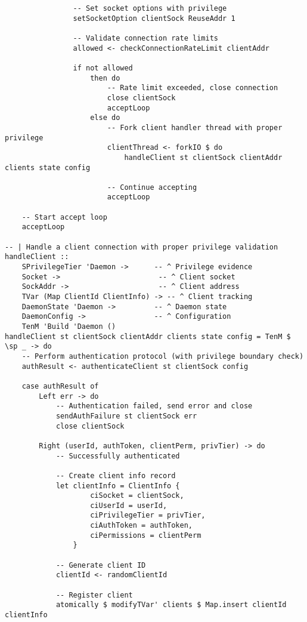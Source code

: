 \documentclass{article}
\begin{document}
\begin{tcolorbox}[title=Ten/Daemon/Server.hs Changes]
\begin{verbatim}
                -- Set socket options with privilege
                setSocketOption clientSock ReuseAddr 1

                -- Validate connection rate limits
                allowed <- checkConnectionRateLimit clientAddr

                if not allowed
                    then do
                        -- Rate limit exceeded, close connection
                        close clientSock
                        acceptLoop
                    else do
                        -- Fork client handler thread with proper privilege
                        clientThread <- forkIO $ do
                            handleClient st clientSock clientAddr clients state config

                        -- Continue accepting
                        acceptLoop

    -- Start accept loop
    acceptLoop

-- | Handle a client connection with proper privilege validation
handleClient ::
    SPrivilegeTier 'Daemon ->      -- ^ Privilege evidence
    Socket ->                       -- ^ Client socket
    SockAddr ->                     -- ^ Client address
    TVar (Map ClientId ClientInfo) -> -- ^ Client tracking
    DaemonState 'Daemon ->         -- ^ Daemon state
    DaemonConfig ->                -- ^ Configuration
    TenM 'Build 'Daemon ()
handleClient st clientSock clientAddr clients state config = TenM $ \sp _ -> do
    -- Perform authentication protocol (with privilege boundary check)
    authResult <- authenticateClient st clientSock config

    case authResult of
        Left err -> do
            -- Authentication failed, send error and close
            sendAuthFailure st clientSock err
            close clientSock

        Right (userId, authToken, clientPerm, privTier) -> do
            -- Successfully authenticated

            -- Create client info record
            let clientInfo = ClientInfo {
                    ciSocket = clientSock,
                    ciUserId = userId,
                    ciPrivilegeTier = privTier,
                    ciAuthToken = authToken,
                    ciPermissions = clientPerm
                }

            -- Generate client ID
            clientId <- randomClientId

            -- Register client
            atomically $ modifyTVar' clients $ Map.insert clientId clientInfo


\end{verbatim}
\end{tcolorbox}
\end{document}
